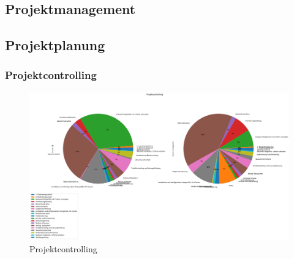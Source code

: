 
\clearpage
{}
\recalctypearea
\begin{flushleft}
    \chapter{Projektmanagement}
    \section{Projektplanung}
    \subsection{Projektcontrolling}
    

    \begin{figure}[H]
        \centering
        \includegraphics[width=0.75\linewidth]{source/pandas_data_chart_plotter/projektcontrolling}
        \caption{Projektcontrolling}
        \label{fig:projektcontrolling}
    \end{figure}
\end{flushleft}
